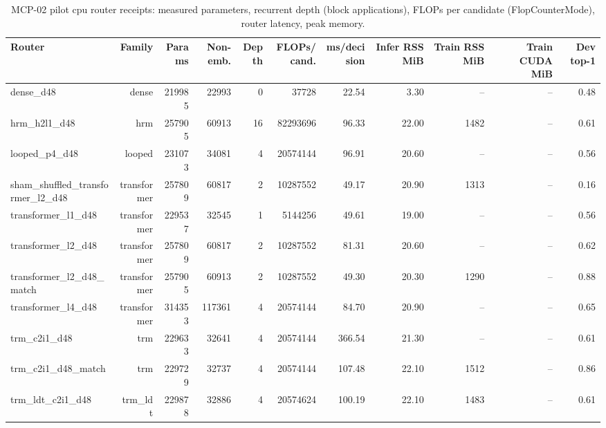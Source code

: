 \begin{table}[t]
\centering
\small
\begin{adjustbox}{max width=\linewidth}
\begin{tabular}{lrrrrrrrrrr}
\toprule
Router & Family & Params & Non-emb. & Depth & FLOPs/cand. & ms/decision & Infer RSS MiB & Train RSS MiB & Train CUDA MiB & Dev top-1 \\
\midrule
dense\_d48 & dense & 219985 & 22993 & 0 & 37728 & 22.54 & 3.30 & -- & -- & 0.48 \\
hrm\_h2l1\_d48 & hrm & 257905 & 60913 & 16 & 82293696 & 96.33 & 22.00 & 1482 & -- & 0.61 \\
looped\_p4\_d48 & looped & 231073 & 34081 & 4 & 20574144 & 96.91 & 20.60 & -- & -- & 0.56 \\
sham\_shuffled\_transformer\_l2\_d48 & transformer & 257809 & 60817 & 2 & 10287552 & 49.17 & 20.90 & 1313 & -- & 0.16 \\
transformer\_l1\_d48 & transformer & 229537 & 32545 & 1 & 5144256 & 49.61 & 19.00 & -- & -- & 0.56 \\
transformer\_l2\_d48 & transformer & 257809 & 60817 & 2 & 10287552 & 81.31 & 20.60 & -- & -- & 0.62 \\
transformer\_l2\_d48\_match & transformer & 257905 & 60913 & 2 & 10287552 & 49.30 & 20.30 & 1290 & -- & 0.88 \\
transformer\_l4\_d48 & transformer & 314353 & 117361 & 4 & 20574144 & 84.70 & 20.90 & -- & -- & 0.65 \\
trm\_c2i1\_d48 & trm & 229633 & 32641 & 4 & 20574144 & 366.54 & 21.30 & -- & -- & 0.61 \\
trm\_c2i1\_d48\_match & trm & 229729 & 32737 & 4 & 20574144 & 107.48 & 22.10 & 1512 & -- & 0.86 \\
trm\_ldt\_c2i1\_d48 & trm\_ldt & 229878 & 32886 & 4 & 20574624 & 100.19 & 22.10 & 1483 & -- & 0.61 \\
\bottomrule
\end{tabular}
\end{adjustbox}
\caption{MCP-02 pilot cpu router receipts: measured parameters, recurrent depth (block applications), FLOPs per candidate (FlopCounterMode), router latency, peak memory.}
\label{tab:mcp02-pilot_cpu-receipts}
\end{table}
